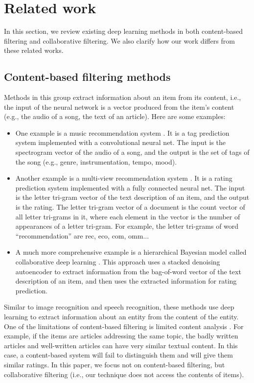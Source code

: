 \documentclass[12pt]{WSUThesis}
\theoremstyle{definition}
\begin{document}
\section{Related work}
In this section,
we review existing deep learning methods in both content-based 
filtering and collaborative filtering.
We also clarify how our work differs from these related works.

\subsection{Content-based filtering methods}
Methods in this group extract information about an item from its content, 
i.e., the input of the neural network is a vector produced from the item's 
content (e.g., the audio of a song, the text of an article). Here are some 
examples:
\begin{itemize}
	\item One example is a music recommendation system 	\cite{van2013deep}. 
	It is a tag prediction system implemented with a convolutional neural net. 
	The input is the spectrogram vector of the audio of a song,
	and the output 	is the set of tags of the song (e.g., genre, instrumentation, tempo, mood).
	\item Another example is a multi-view recommendation system 	
	\cite{elkahky2015multi}. 
	It is a rating prediction system implemented with a fully connected 
	neural net.
	The input is the letter tri-gram vector of the text description of an item, 
	and the output is the rating.
	The letter tri-gram vector of a document is the count vector of all letter tri-grams in it, where each element in the vector is the number of appearances of a letter tri-gram. For example, the letter tri-grams of word ``recommendation'' are rec, eco, com, omm...
	\item A much more comprehensive example is a hierarchical Bayesian model 
	called collaborative deep learning \cite{wang2015collaborative}.
	This approach uses a stacked denoising autoencoder to extract information 
	from the bag-of-word vector of the text description of an item,
	and then uses the extracted information for rating prediction.
\end{itemize}
Similar to image recognition and speech recognition, these methods use deep 
learning to extract information about an entity from the content of the entity.
One of the limitations of content-based filtering is limited content analysis 
\cite{adomavicius2005toward}.
For example, if the items are articles addressing the same topic,
the badly written articles and well-written articles can have very similar 
textual content. In this case, a content-based system will fail to distinguish 
them and will give them similar ratings.
In this paper, we focus not on content-based filtering, but collaborative 
filtering (i.e., our technique does not access the contents of items).
\end{document}

